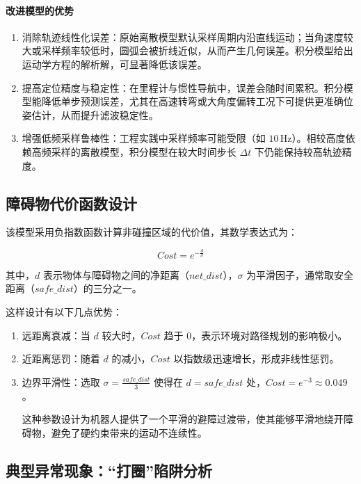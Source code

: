 \documentclass[
  oneside,
  degree=bachelor,
  fullwidthstop=false,
  fontset=fandol,
  times=false,
  minted=true,
  biblatex=true,
]{tongjithesis}
\begin{document}
\paragraph{改进模型的优势}
\begin{enumerate}
    \item 消除轨迹线性化误差：原始离散模型默认采样周期内沿直线运动；当角速度较大或采样频率较低时，圆弧会被折线近似，从而产生几何误差。积分模型给出运动学方程的解析解，可显著降低该误差。
    \item 提高定位精度与稳定性：在里程计与惯性导航中，误差会随时间累积。积分模型能降低单步预测误差，尤其在高速转弯或大角度偏转工况下可提供更准确位姿估计，从而提升滤波稳定性。
    \item 增强低频采样鲁棒性：工程实践中采样频率可能受限（如 $10\,\mathrm{Hz}$）。相较高度依赖高频采样的离散模型，积分模型在较大时间步长 $\Delta t$ 下仍能保持较高轨迹精度。
\end{enumerate}

\subsection{障碍物代价函数设计}

该模型采用负指数函数计算非碰撞区域的代价值，其数学表达式为：

\begin{equation}
Cost = e^{-\frac{d}{\sigma}}
\end{equation}

其中，$d$ 表示物体与障碍物之间的净距离（$net\_dist$），$\sigma$ 为平滑因子，通常取安全距离（$safe\_dist$）的三分之一。

这样设计有以下几点优势：
\begin{enumerate}
    \item 远距离衰减：当 $d$ 较大时，$Cost$ 趋于 $0$，表示环境对路径规划的影响极小。
    \item 近距离惩罚：随着 $d$ 的减小，$Cost$ 以指数级迅速增长，形成非线性惩罚。
    \item 边界平滑性：选取 $\sigma = \frac{safe\_dist}{3}$ 使得在 $d = safe\_dist$ 处，$Cost = e^{-3} \approx 0.049$。
    
    这种参数设计为机器人提供了一个平滑的避障过渡带，使其能够平滑地绕开障碍物，避免了硬约束带来的运动不连续性。
\end{enumerate}

\subsection{典型异常现象：“打圈”陷阱分析}
\end{document}
